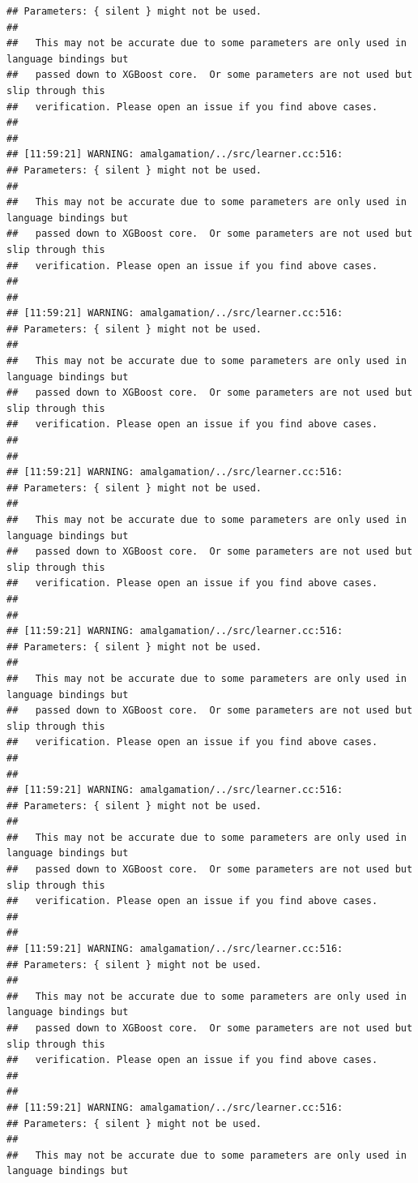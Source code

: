 \documentclass[AMS,STIX2COL]{WileyNJD-v2}\usepackage[]{graphicx}\usepackage[]{color}
\makeatletter
\newenvironment{kframe}{%
 \def\at@end@of@kframe{}%
 \ifinner\ifhmode%
  \def\at@end@of@kframe{\end{minipage}}%
  \begin{minipage}{\columnwidth}%
 \fi\fi%
 \def\FrameCommand##1{\hskip\@totalleftmargin \hskip-\fboxsep
 \colorbox{shadecolor}{##1}\hskip-\fboxsep
     \hskip-\linewidth \hskip-\@totalleftmargin \hskip\columnwidth}%
 \MakeFramed {\advance\hsize-\width
   \@totalleftmargin\z@ \linewidth\hsize
   \@setminipage}}%
 {\par\unskip\endMakeFramed%
 \at@end@of@kframe}
\newenvironment{knitrout}{}{} %
\makeatother
\begin{document}
\begin{knitrout}
\begin{kframe}
\begin{verbatim}
## Parameters: { silent } might not be used.
## 
##   This may not be accurate due to some parameters are only used in language bindings but
##   passed down to XGBoost core.  Or some parameters are not used but slip through this
##   verification. Please open an issue if you find above cases.
## 
## 
## [11:59:21] WARNING: amalgamation/../src/learner.cc:516: 
## Parameters: { silent } might not be used.
## 
##   This may not be accurate due to some parameters are only used in language bindings but
##   passed down to XGBoost core.  Or some parameters are not used but slip through this
##   verification. Please open an issue if you find above cases.
## 
## 
## [11:59:21] WARNING: amalgamation/../src/learner.cc:516: 
## Parameters: { silent } might not be used.
## 
##   This may not be accurate due to some parameters are only used in language bindings but
##   passed down to XGBoost core.  Or some parameters are not used but slip through this
##   verification. Please open an issue if you find above cases.
## 
## 
## [11:59:21] WARNING: amalgamation/../src/learner.cc:516: 
## Parameters: { silent } might not be used.
## 
##   This may not be accurate due to some parameters are only used in language bindings but
##   passed down to XGBoost core.  Or some parameters are not used but slip through this
##   verification. Please open an issue if you find above cases.
## 
## 
## [11:59:21] WARNING: amalgamation/../src/learner.cc:516: 
## Parameters: { silent } might not be used.
## 
##   This may not be accurate due to some parameters are only used in language bindings but
##   passed down to XGBoost core.  Or some parameters are not used but slip through this
##   verification. Please open an issue if you find above cases.
## 
## 
## [11:59:21] WARNING: amalgamation/../src/learner.cc:516: 
## Parameters: { silent } might not be used.
## 
##   This may not be accurate due to some parameters are only used in language bindings but
##   passed down to XGBoost core.  Or some parameters are not used but slip through this
##   verification. Please open an issue if you find above cases.
## 
## 
## [11:59:21] WARNING: amalgamation/../src/learner.cc:516: 
## Parameters: { silent } might not be used.
## 
##   This may not be accurate due to some parameters are only used in language bindings but
##   passed down to XGBoost core.  Or some parameters are not used but slip through this
##   verification. Please open an issue if you find above cases.
## 
## 
## [11:59:21] WARNING: amalgamation/../src/learner.cc:516: 
## Parameters: { silent } might not be used.
## 
##   This may not be accurate due to some parameters are only used in language bindings but

\end{verbatim}
\end{kframe}
\end{knitrout}
\end{document}
